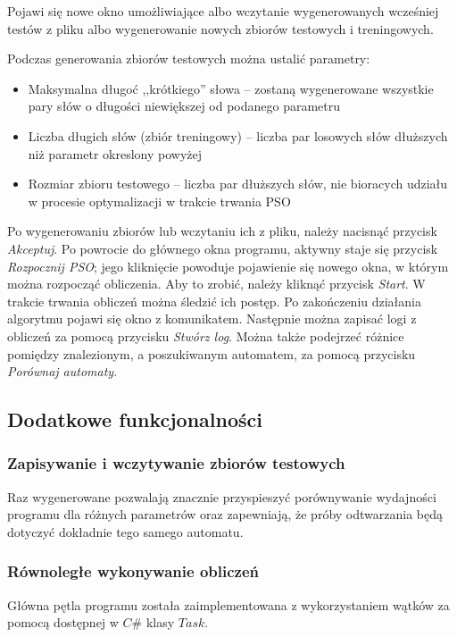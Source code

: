 \documentclass{../llncs_template_final/llncs}
\begin{document}
Pojawi się nowe okno umożliwiające albo wczytanie wygenerowanych wcześniej testów z pliku albo wygenerowanie nowych zbiorów testowych i treningowych.

 Podczas generowania zbiorów testowych można ustalić parametry:

\begin{itemize}
\item Maksymalna długoć ,,krótkiego'' słowa -- zostaną wygenerowane wszystkie pary słów o długości niewiększej od podanego parametru
\item Liczba długich słów (zbiór treningowy) -- liczba par losowych słów dłuższych niż parametr okreslony powyżej
\item Rozmiar zbioru testowego -- liczba par dłuższych słów, nie bioracych udziału w procesie optymalizacji w trakcie trwania PSO
\end{itemize}

Po wygenerowaniu zbiorów lub wczytaniu ich z pliku, należy nacisnąć przycisk \emph{Akceptuj}. Po powrocie do głównego okna programu, aktywny staje się przycisk \emph{Rozpocznij PSO}; jego kliknięcie powoduje pojawienie się nowego okna, w którym można rozpocząć obliczenia. Aby to zrobić, należy kliknąć przycisk \emph{Start}. W trakcie trwania obliczeń można śledzić ich postęp. Po zakończeniu działania algorytmu pojawi się okno z komunikatem. Następnie można zapisać logi z obliczeń za pomocą przycisku \emph{Stwórz log}. Można także podejrzeć różnice pomiędzy znalezionym, a poszukiwanym automatem, za pomocą przycisku \emph{Porównaj automaty}. 

\subsection{Dodatkowe funkcjonalności}

\subsubsection{Zapisywanie i wczytywanie zbiorów testowych}
Raz wygenerowane pozwalają znacznie przyspieszyć porównywanie wydajności programu dla różnych parametrów oraz zapewniają, że próby odtwarzania będą dotyczyć dokładnie tego samego automatu.

\subsubsection{Równoległe wykonywanie obliczeń}
Główna pętla programu została zaimplementowana z wykorzystaniem wątków za pomocą dostępnej w $C\#$ klasy $Task$.
\end{document}
